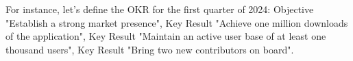 \noindent For instance, let's define the OKR for the first quarter of 2024: Objective "Establish a strong market 
presence", Key Result "Achieve one million downloads of the application", Key Result "Maintain an active user base of 
at least one thousand users", Key Result "Bring two new contributors on board".
